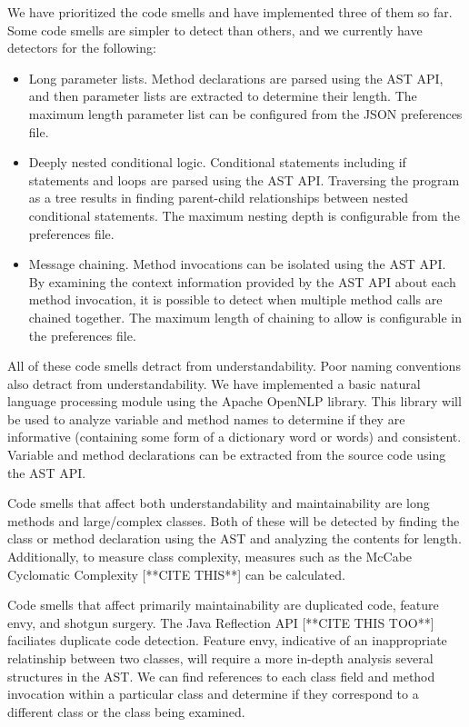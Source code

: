\documentclass{sig-alternate}
\begin{document}
We have prioritized the code smells and have implemented three of them so far.
Some code smells are simpler to detect than others, and we currently have
detectors for the following:

\begin{itemize}
	\item Long parameter lists. Method declarations are parsed using the AST
		API, and then parameter lists are extracted to determine their length.
		The maximum length parameter list can be configured from the JSON
		preferences file.
	\item Deeply nested conditional logic. Conditional statements including if
		statements and loops are parsed using the AST API. Traversing the
		program as a tree results in finding parent-child relationships between
		nested conditional statements. The maximum nesting depth is configurable
		from the preferences file. 
	\item Message chaining. Method invocations can be isolated using the AST
		API. By examining the context information provided by the AST API about
		each method invocation, it is possible to detect when multiple method
		calls are chained together. The maximum length of chaining to allow is
		configurable in the preferences file.
\end{itemize}

All of these code smells detract from understandability. Poor naming conventions
also detract from understandability. We have implemented a basic natural
language processing module using the Apache OpenNLP library. This library will
be used to analyze variable and method names to determine if they are
informative (containing some form of a dictionary word or words) and consistent.
Variable and method declarations can be extracted from the source code using the
AST API. 

Code smells that affect both understandability and maintainability are long methods
and large/complex classes. Both of these will be detected by finding the class
or method declaration using the AST and analyzing the contents for length.
Additionally, to measure class complexity, measures such as the McCabe
Cyclomatic Complexity [**CITE THIS**] can be calculated. 

Code smells that affect primarily maintainability are duplicated code,
feature envy, and shotgun surgery. The Java Reflection API [**CITE THIS TOO**]
faciliates duplicate code detection. Feature envy, indicative of an
inappropriate relatinship between two classes, will require a more in-depth
analysis several structures in the AST. We can find references to each class
field and method invocation within a particular class and determine if they
correspond to a different class or the class being examined. 
\end{document}
